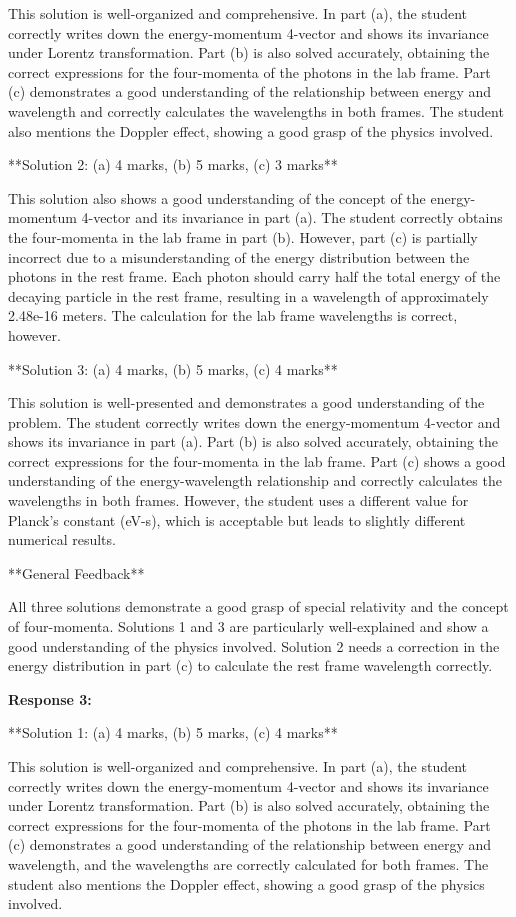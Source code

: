 \documentclass[a4paper,11pt]{article}
\begin{document}
This solution is well-organized and comprehensive. In part (a), the student correctly writes down the energy-momentum 4-vector and shows its invariance under Lorentz transformation. Part (b) is also solved accurately, obtaining the correct expressions for the four-momenta of the photons in the lab frame. Part (c) demonstrates a good understanding of the relationship between energy and wavelength and correctly calculates the wavelengths in both frames. The student also mentions the Doppler effect, showing a good grasp of the physics involved.

**Solution 2: (a) 4 marks, (b) 5 marks, (c) 3 marks**

This solution also shows a good understanding of the concept of the energy-momentum 4-vector and its invariance in part (a). The student correctly obtains the four-momenta in the lab frame in part (b). However, part (c) is partially incorrect due to a misunderstanding of the energy distribution between the photons in the rest frame. Each photon should carry half the total energy of the decaying particle in the rest frame, resulting in a wavelength of approximately 2.48e-16 meters. The calculation for the lab frame wavelengths is correct, however.

**Solution 3: (a) 4 marks, (b) 5 marks, (c) 4 marks**

This solution is well-presented and demonstrates a good understanding of the problem. The student correctly writes down the energy-momentum 4-vector and shows its invariance in part (a). Part (b) is also solved accurately, obtaining the correct expressions for the four-momenta in the lab frame. Part (c) shows a good understanding of the energy-wavelength relationship and correctly calculates the wavelengths in both frames. However, the student uses a different value for Planck's constant (eV-s), which is acceptable but leads to slightly different numerical results.

**General Feedback**

All three solutions demonstrate a good grasp of special relativity and the concept of four-momenta. Solutions 1 and 3 are particularly well-explained and show a good understanding of the physics involved. Solution 2 needs a correction in the energy distribution in part (c) to calculate the rest frame wavelength correctly.

\bigskip    
\textbf{Response 3:}

**Solution 1: (a) 4 marks, (b) 5 marks, (c) 4 marks**

This solution is well-organized and comprehensive. In part (a), the student correctly writes down the energy-momentum 4-vector and shows its invariance under Lorentz transformation. Part (b) is also solved accurately, obtaining the correct expressions for the four-momenta of the photons in the lab frame. Part (c) demonstrates a good understanding of the relationship between energy and wavelength, and the wavelengths are correctly calculated for both frames. The student also mentions the Doppler effect, showing a good grasp of the physics involved.
\end{document}
